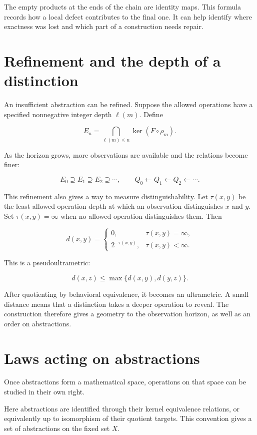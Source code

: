 \documentclass[11pt,oneside,openany]{book}
\begin{document}
The empty products at the ends of the chain are identity maps. This formula records how a local defect contributes to the final one. It can help identify where exactness was lost and which part of a construction needs repair.

\section{Refinement and the depth of a distinction}
An insufficient abstraction can be refined. Suppose the allowed operations have a specified nonnegative integer depth \(\ell(m)\). Define

\[
E_n=\bigcap_{\ell(m)\leq n}\ker(F\circ\rho_m).
\]

As the horizon grows, more observations are available and the relations become finer:

\[
E_0\supseteq E_1\supseteq E_2\supseteq\cdots,
\qquad
Q_0\longleftarrow Q_1\longleftarrow Q_2\longleftarrow\cdots.
\]

This refinement also gives a way to measure distinguishability. Let \(\tau(x,y)\) be the least allowed operation depth at which an observation distinguishes \(x\) and \(y\). Set \(\tau(x,y)=\infty\) when no allowed operation distinguishes them. Then

\[
d(x,y)=
\begin{cases}
0,&\tau(x,y)=\infty,\\
2^{-\tau(x,y)},&\tau(x,y)<\infty.
\end{cases}
\]

This is a pseudoultrametric:

\[
d(x,z)\leq\max\{d(x,y),d(y,z)\}.
\]

After quotienting by behavioral equivalence, it becomes an ultrametric. A small distance means that a distinction takes a deeper operation to reveal. The construction therefore gives a geometry to the observation horizon, as well as an order on abstractions.

\section{Laws acting on abstractions}
Once abstractions form a mathematical space, operations on that space can be studied in their own right.

Here abstractions are identified through their kernel equivalence relations, or equivalently up to isomorphism of their quotient targets. This convention gives a set of abstractions on the fixed set \(X\).
\end{document}

